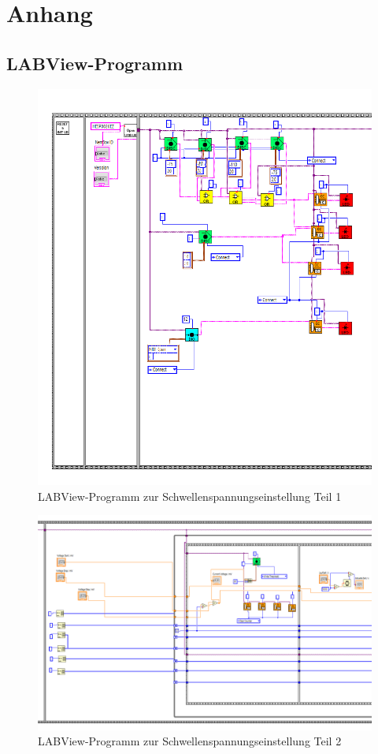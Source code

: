 \documentclass{article}
\begin{document}
\section{Anhang}

\subsection{LABView-Programm}
\begin{figure}
    \centering
    \includegraphics[width=1\textwidth]{figures/ProgrammScreen1.png}
    \caption{LABView-Programm zur Schwellenspannungseinstellung Teil 1}
    \label{fig:LABView1}
\end{figure}
\begin{figure}
    \centering
    \includegraphics[width=1\textwidth]{figures/ProgrammScreen2.png}
    \caption{LABView-Programm zur Schwellenspannungseinstellung Teil 2}
    \label{fig:LABView2}
\end{figure}
\end{document}
